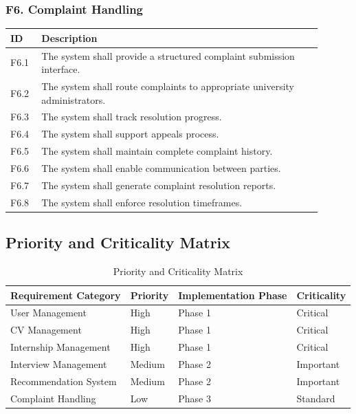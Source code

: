 \subsubsection{F6. Complaint Handling}
\begin{center}
    \begin{longtable}{ |l|p{0.9\linewidth}| }
        \hline
        \textbf{ID} & \textbf{Description} \\
        \hline
        F6.1 & The system shall provide a structured complaint submission interface. \\
        \hline
        F6.2 & The system shall route complaints to appropriate university administrators. \\
        \hline
        F6.3 & The system shall track resolution progress. \\
        \hline
        F6.4 & The system shall support appeals process. \\
        \hline
        F6.5 & The system shall maintain complete complaint history. \\
        \hline
        F6.6 & The system shall enable communication between parties. \\
        \hline
        F6.7 & The system shall generate complaint resolution reports. \\
        \hline
        F6.8 & The system shall enforce resolution timeframes. \\
        \hline
    \end{longtable}
\end{center}

\subsection{Priority and Criticality Matrix}
\label{subsec:priority_criticality_matrix}%

\begin{table}[H]
    \centering
    \begin{tabular}{ |l|l|l|l| }
        \hline
        \textbf{Requirement Category} & \textbf{Priority} & \textbf{Implementation Phase} & \textbf{Criticality} \\
        \hline
        User Management & High & Phase 1 & Critical \\
        \hline
        CV Management & High & Phase 1 & Critical \\
        \hline
        Internship Management & High & Phase 1 & Critical \\
        \hline
        Interview Management & Medium & Phase 2 & Important \\
        \hline
        Recommendation System & Medium & Phase 2 & Important \\
        \hline
        Complaint Handling & Low & Phase 3 & Standard \\
        \hline
    \end{tabular}
    \caption{Priority and Criticality Matrix}
    \label{tab:priority_criticality_matrix}
\end{table}


